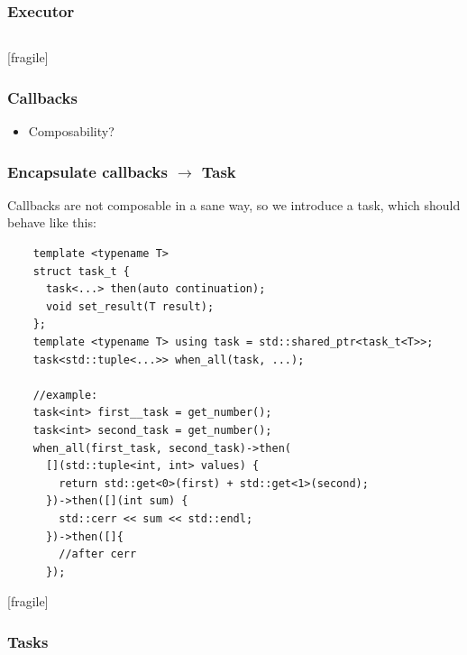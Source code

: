\begin{frame}[fragile]
  \frametitle{Executor}
  \inputminted[fontsize=\scriptsize,firstline=12,lastline=35]{cpp}{/home/thingdust/src/mixed/src/executor.h}
\end{frame}

\begin{frame}{[fragile]}
  \frametitle{Callbacks}
  \pause
  \begin{itemize}
    \item Composability?
  \end{itemize}
\end{frame}%

\begin{frame}[fragile]
  \frametitle{Encapsulate callbacks $\rightarrow$ Task}
  Callbacks are not composable in a sane way, so we introduce a task, which should behave like this:
  \vspace{3mm}
  \begin{verbatim}
    template <typename T>
    struct task_t { 
      task<...> then(auto continuation);
      void set_result(T result);
    };
    template <typename T> using task = std::shared_ptr<task_t<T>>;
    task<std::tuple<...>> when_all(task, ...);

    //example:
    task<int> first__task = get_number();
    task<int> second_task = get_number();
    when_all(first_task, second_task)->then(
      [](std::tuple<int, int> values) {
        return std::get<0>(first) + std::get<1>(second);
      })->then([](int sum) {
        std::cerr << sum << std::endl;
      })->then([]{
        //after cerr
      });
  \end{verbatim}
\end{frame}

\begin{frame}{[fragile]}
  \frametitle{Tasks }
\end{frame}%

